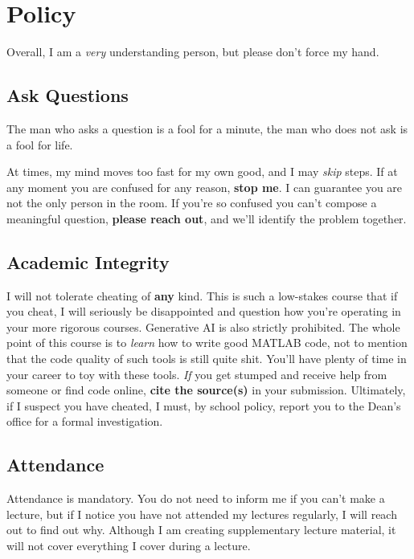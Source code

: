 \documentclass{article}
\begin{document}
\section{Policy}

Overall, I am a \emph{very} understanding person, but please don't force
my hand.

\subsection{Ask Questions}

\begin{displayquote}[Confucius]
	The man who asks a question is a fool for a minute, the man who
	does not ask is a fool for life.
\end{displayquote}

At times, my mind moves too fast for my own good, and I may \emph{skip}
steps.  If at any moment you are confused for any reason, \textbf{stop
me}.  I can guarantee you are not the only person in the room.  If
you're so confused you can't compose a meaningful question,
\textbf{please reach out}, and we'll identify the problem together.

\subsection{Academic Integrity}

I will not tolerate cheating of \textbf{any} kind.  This is such a
low-stakes course that if you cheat, I will seriously be disappointed
and question how you're operating in your more rigorous courses.
Generative AI is also strictly prohibited.  The whole point of this
course is to \emph{learn} how to write good MATLAB code, not to mention
that the code quality of such tools is still quite shit.  You'll have
plenty of time in your career to toy with these tools.  \emph{If} you
get stumped and receive help from someone or find code online,
\textbf{cite the source(s)} in your submission.  Ultimately, if I
suspect you have cheated, I must, by school policy, report you to the
Dean's office for a formal investigation.

\subsection{Attendance}

Attendance is mandatory.  You do not need to inform me if you can't make
a lecture, but if I notice you have not attended my lectures regularly,
I will reach out to find out why.  Although I am creating supplementary
lecture material, it will not cover everything I cover during a lecture.
\end{document}
